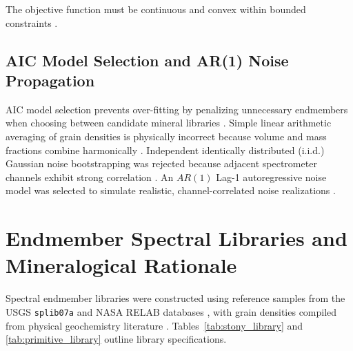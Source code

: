 \documentclass[11pt,a4paper]{article}
\begin{document}
The objective function must be continuous and convex within bounded constraints \cite{Lawson1995, Huber1964}.

\subsection{AIC Model Selection and AR(1) Noise Propagation}
AIC model selection prevents over-fitting by penalizing unnecessary endmembers when choosing between candidate mineral libraries \cite{Akaike1974}. Simple linear arithmetic averaging of grain densities is physically incorrect because volume and mass fractions combine harmonically \cite{Consolmagno2008, Britt2003}. Independent identically distributed (i.i.d.) Gaussian noise bootstrapping was rejected because adjacent spectrometer channels exhibit strong correlation \cite{Efron1993, Press2007}. An $AR(1)$ Lag-1 autoregressive noise model was selected to simulate realistic, channel-correlated noise realizations \cite{Efron1993, Press2007}.

\section{Endmember Spectral Libraries and Mineralogical Rationale}
\label{sec:libraries}

Spectral endmember libraries were constructed using reference samples from the USGS \texttt{splib07a} \cite{Clark2007} and NASA RELAB databases \cite{Pieters2004}, with grain densities compiled from physical geochemistry literature \cite{Consolmagno2008, Deer2013, Buchwald1975, Britt2003, Macke2011}. Tables~\ref{tab:stony_library} and \ref{tab:primitive_library} outline library specifications.
\end{document}

